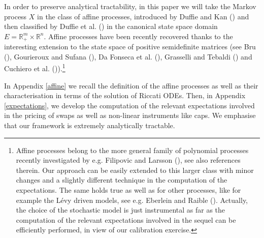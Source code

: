 \documentclass[12pt,a4paper]{article}
\theoremstyle{plain}
\numberwithin{equation}{section}
\begin{document}
In order to preserve analytical tractability, in this paper we will take the Markov process $X$ in the class of affine processes, introduced by Duffie and Kan (\citeyear*{DuffieKan1996}) and then classified by Duffie et al. (\citeyear*{DuffieEtAl2003}) in the canonical state space domain $E=\mathbb{R}^m_+ \times \mathbb{R}^n$. Affine processes have been recently recovered thanks to the interesting extension to the state space  of positive semidefinite matrices (see Bru (\citeyear*{Bru1991}), Gourieroux and Sufana (\citeyear*{GourierouxSufana2003}),
Da Fonseca et al. (\citeyear*{DaFonsecaEtAl2007}),
 Grasselli and Tebaldi (\citeyear*{GrasselliTebaldi2008})  and Cuchiero et al. (\citeyear*{CuchieroEtAl2011})).\footnote{Affine processes belong to the  more general family of polynomial processes recently investigated by e.g.  Filipovic and Larsson (\citeyear*{polynomial}), see also references therein. Our approach can be easily extended to this larger class with minor changes and a slightly different technique in the computation of the expectations. The same holds true as well as for other processes, like for example the L\'evy driven models, see e.g. Eberlein and Raible (\citeyear*{EberleinRaible(1999)}).  Actually, the choice of the stochastic model is just instrumental as far as the computation of the relevant expectations involved in the sequel can be efficiently performed, in view of our calibration exercise.}

In Appendix \ref{affine} we recall the definition of the affine processes as well as their characterisation in terms of the solution of Riccati ODEs. Then, in Appendix \ref{expectations}, we develop the computation of the relevant expectations involved in the pricing of swaps as well as non-linear instruments like caps. We emphasise that our framework is extremely analytically tractable.
\end{document}
